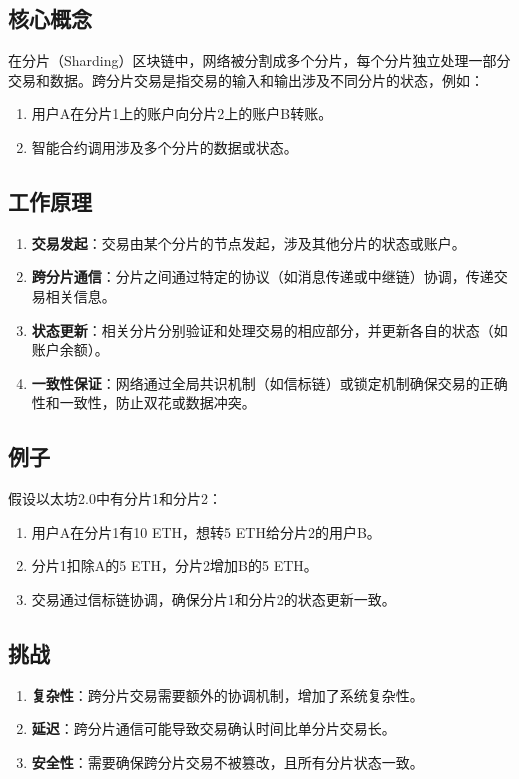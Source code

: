 \documentclass[12pt]{ctexart}
\begin{document}
\subsection{核心概念}
在分片（Sharding）区块链中，网络被分割成多个分片，每个分片独立处理一部分交易和数据。跨分片交易是指交易的输入和输出涉及不同分片的状态，例如：
\begin{enumerate}
    \item 用户A在分片1上的账户向分片2上的账户B转账。
    \item 智能合约调用涉及多个分片的数据或状态。
\end{enumerate}

\subsection{工作原理}
\begin{enumerate}
    \item \textbf{交易发起}：交易由某个分片的节点发起，涉及其他分片的状态或账户。
    \item \textbf{跨分片通信}：分片之间通过特定的协议（如消息传递或中继链）协调，传递交易相关信息。
    \item \textbf{状态更新}：相关分片分别验证和处理交易的相应部分，并更新各自的状态（如账户余额）。
    \item \textbf{一致性保证}：网络通过全局共识机制（如信标链）或锁定机制确保交易的正确性和一致性，防止双花或数据冲突。
\end{enumerate}

\subsection{例子}
假设以太坊2.0中有分片1和分片2：
\begin{enumerate}
    \item 用户A在分片1有10 ETH，想转5 ETH给分片2的用户B。
    \item 分片1扣除A的5 ETH，分片2增加B的5 ETH。
    \item 交易通过信标链协调，确保分片1和分片2的状态更新一致。
\end{enumerate}

\subsection{挑战}
\begin{enumerate}
    \item \textbf{复杂性}：跨分片交易需要额外的协调机制，增加了系统复杂性。
    \item \textbf{延迟}：跨分片通信可能导致交易确认时间比单分片交易长。
    \item \textbf{安全性}：需要确保跨分片交易不被篡改，且所有分片状态一致。
\end{enumerate}
\end{document}
